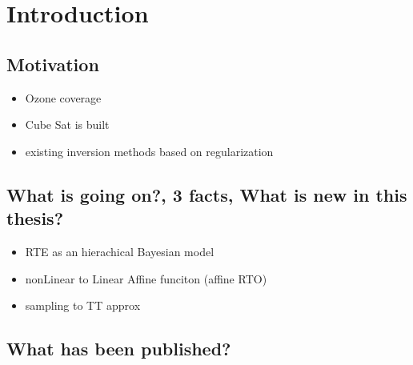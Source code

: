 \chapter{Introduction}
\section{Motivation}
\begin{itemize}
	\item Ozone coverage
	\item Cube Sat is built
	\item existing inversion methods based on regularization
\end{itemize}

\section{What is going on?, 3 facts, What is new in this thesis?}
\begin{itemize}
	\item RTE as an hierachical Bayesian model
	\item nonLinear to Linear Affine funciton (affine RTO)
	\item sampling to TT approx
\end{itemize}

\section{What has been published?}